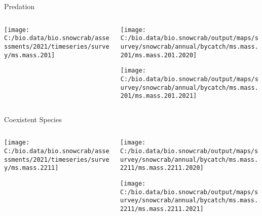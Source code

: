 \documentclass[
  ignorenonframetext,
]{beamer}
\begin{document}
\begin{frame}{Predation}
\protect\hypertarget{predation-1}{}
\begin{columns}[T]
\begin{column}{0.48\textwidth}
\begin{center}\texttt{[image: C:/bio.data/bio.snowcrab/assessments/2021/timeseries/survey/ms.mass.201]} \end{center}
\end{column}

\begin{column}{0.48\textwidth}
\begin{center}\texttt{[image: C:/bio.data/bio.snowcrab/output/maps/survey/snowcrab/annual/bycatch/ms.mass.201/ms.mass.201.2020]} \end{center}

\begin{center}\texttt{[image: C:/bio.data/bio.snowcrab/output/maps/survey/snowcrab/annual/bycatch/ms.mass.201/ms.mass.201.2021]} \end{center}
\end{column}
\end{columns}
\end{frame}

\begin{frame}{Coexistent Species}
\protect\hypertarget{coexistent-species}{}
\begin{columns}[T]
\begin{column}{0.48\textwidth}
\begin{center}\texttt{[image: C:/bio.data/bio.snowcrab/assessments/2021/timeseries/survey/ms.mass.2211]} \end{center}
\end{column}

\begin{column}{0.48\textwidth}
\begin{center}\texttt{[image: C:/bio.data/bio.snowcrab/output/maps/survey/snowcrab/annual/bycatch/ms.mass.2211/ms.mass.2211.2020]} \end{center}

\begin{center}\texttt{[image: C:/bio.data/bio.snowcrab/output/maps/survey/snowcrab/annual/bycatch/ms.mass.2211/ms.mass.2211.2021]} \end{center}
\end{column}
\end{columns}
\end{frame}
\end{document}
